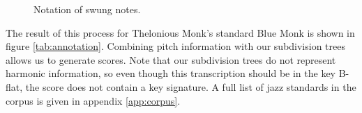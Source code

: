 \begin{figure}
\centering
{}

\caption{Notation of swung notes.}
\label{fig:swing}
\end{figure}

The result of this process for Thelonious Monk's standard Blue Monk is shown in figure \ref{tab:annotation}. Combining pitch information with our subdivision trees allows us to generate scores. Note that our subdivision trees do not represent harmonic information, so even though this transcription should be in the key B-flat, the score does not contain a key signature. A full list of jazz standards in the corpus is given in appendix \ref{app:corpus}.

